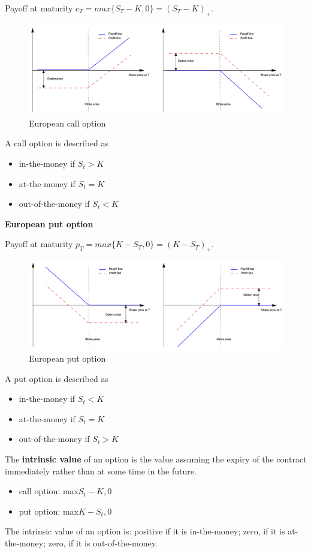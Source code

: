 \documentclass[11pt,a4paper]{book}
\theoremstyle{definition}\newtheorem{definition}{Definition}
\theoremstyle{definition}\newtheorem{fact}{Fact}
\theoremstyle{definition}\newtheorem{remark}{Remark}
\theoremstyle{definition}\newtheorem{ex}{Ex.}
\theoremstyle{definition}\newtheorem{project}{Project}
\theoremstyle{definition}\newtheorem{problem}{Problem}
\theoremstyle{definition}\newtheorem{example}{Example}
\numberwithin{theorem}{section}
\numberwithin{corollary}{chapter}
\numberwithin{assumption}{chapter}
\numberwithin{definition}{chapter}
\numberwithin{prop}{chapter}
\numberwithin{notation}{chapter}
\numberwithin{problem}{chapter}
\numberwithin{example}{chapter}
\numberwithin{fact}{chapter}
\numberwithin{ex}{chapter}
\begin{document}
Payoff at maturity $c_T = max\{S_T - K, 0\} = (S_T - K)_+$.

\begin{figure}[H]
	\centering
	\includegraphics[scale=0.4]{Chapter03/Chapter3_1.png}
	\caption{European call option}
\end{figure}

A call option is described as
\begin{itemize}
\item in-the-money if $S_t > K$
\item at-the-money if $S_t = K$
\item out-of-the-money if $S_t < K$
\end{itemize}

\textbf{European put option}

Payoff at maturity $p_T = max\{K - S_T, 0\} = (K - S_T)_+$.

\begin{figure}[H]
	\centering
	\includegraphics[scale=0.4]{Chapter03/Chapter3_2.png}
	\caption{European put option}
\end{figure}

A put option is described as
\begin{itemize}
\item in-the-money if $S_t < K$
\item at-the-money if $S_t = K$
\item out-of-the-money if $S_t > K$
\end{itemize}

The \textbf{intrinsic value} of an option is the value assuming the expiry of the contract immediately rather than at some time in the future.
\begin{itemize}
\item call option: max{$S_t - K, 0$}
\item put option: max{$K - S_t, 0$}
\end{itemize}
The intrinsic value of an option is: positive if it is in-the-money; zero, if it is at-the-money; zero, if it is out-of-the-money.
\end{document}
